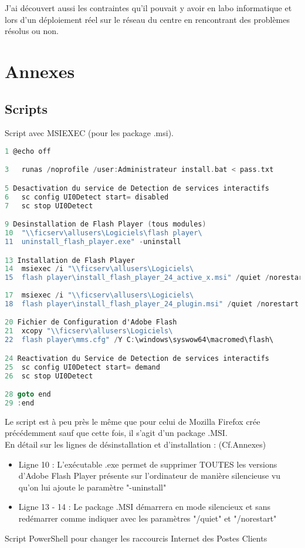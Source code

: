 \documentclass[11pt,a4paper,oneside]{article}
\begin{document}
J'ai découvert aussi les contraintes qu'il pouvait y avoir en labo informatique et lors d'un déploiement réel sur le réseau du centre en rencontrant des problèmes résolus ou non.
\newpage
\section{Annexes}
\subsection{Scripts}
Script avec MSIEXEC (pour les package .msi).
\begin{lstlisting}[language=C]
1 @echo off

3	runas /noprofile /user:Administrateur install.bat < pass.txt

5 Desactivation du service de Detection de services interactifs
6	sc config UI0Detect start= disabled
7	sc stop UI0Detect

9 Desinstallation de Flash Player (tous modules)
10	"\\ficserv\allusers\Logiciels\flash player\
11	uninstall_flash_player.exe" -uninstall

13 Installation de Flash Player
14	msiexec /i "\\ficserv\allusers\Logiciels\
15	flash player\install_flash_player_24_active_x.msi" /quiet /norestart
	
17	msiexec /i "\\ficserv\allusers\Logiciels\
18	flash player\install_flash_player_24_plugin.msi" /quiet /norestart

20 Fichier de Configuration d'Adobe Flash 
21	xcopy "\\ficserv\allusers\Logiciels\
22	flash player\mms.cfg" /Y C:\windows\syswow64\macromed\flash\ 

24 Reactivation du Service de Detection de services interactifs
25	sc config UI0Detect start= demand
26	sc stop UI0Detect

28 goto end
29 :end
\end{lstlisting}

Le script est à peu près le même que pour celui de Mozilla Firefox crée précédemment sauf que cette fois, il s'agit d'un package .MSI.\\
En détail sur les lignes de désinstallation et d'installation : (Cf.Annexes) \\
\begin{itemize}
\item Ligne 10 : L'exécutable .exe permet de supprimer TOUTES les versions d'Adobe Flash Player présente sur 			l'ordinateur de manière silencieuse vu qu'on lui ajoute le paramètre "-uninstall" \\

\item Ligne 13 - 14 : Le package .MSI démarrera en mode silencieux et sans redémarrer comme indiquer avec les paramètres "/quiet" et "/norestart"
\end{itemize}
\newpage
Script PowerShell pour changer les raccourcis Internet des Postes Clients
\end{document}
